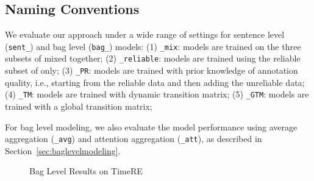 \subsection{Naming Conventions}
We evaluate our approach under a wide range of settings for
 sentence level
(\texttt{sent\_}) and bag level (\texttt{bag\_}) models:
(1) \texttt{\_mix}: models are trained on the three subsets of \TimeRE mixed together;
(2) \texttt{\_reliable}: models are trained using the reliable subset of \TimeRE only;
(3) \texttt{\_PR}: models are trained with prior knowledge of annotation quality, i.e., starting from the reliable data and then adding the unreliable data;
(4) \texttt{\_TM}: models are trained with dynamic transition matrix;
(5) \texttt{\_GTM}: models are trained with a global transition matrix;


For bag level modeling, we also evaluate the model performance using average aggregation (\texttt{\_avg})
and attention aggregation (\texttt{\_att}), as described in Section~\ref{sec:baglevelmodeling}.

\begin{figure}[htbp]
\centering
{}
\caption{Bag Level Results on TimeRE}
\label{fig: results_on_luo}
\end{figure}

